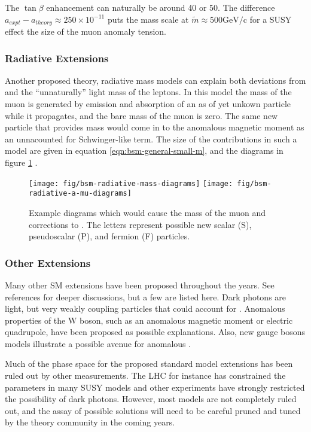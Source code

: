 The $\tan{\beta}$ enhancement can naturally be around 40 or 50.  The difference $a_{expt} - a_{theory} \approx 250 \times 10^{-11}$ puts the mass scale at $\tilde{m} \approx 500 \mathrm{GeV/c}$ for a SUSY effect the size of the muon anomaly tension.

\subsubsection{Radiative Extensions}
Another proposed theory, radiative mass models can explain both deviations from \gmtwo and the ``unnaturally'' light mass of the leptons.  In this model the mass of the muon is generated by emission and absorption of an as of yet unkown particle while it propagates, and the bare mass of the muon is zero.  The same new particle that provides mass would come in to the anomalous magnetic moment as an unnacounted for Schwinger-like term.  The size of the contributions in such a model are given in equation \ref{eqn:bsm-general-small-m}, and the diagrams in figure \ref{fig:bsm-radiative-diagrams} \cite{a-mu-harbinger}.

\begin{figure}
\label{fig:bsm-radiative-diagrams}
\centering
\texttt{[image: fig/bsm-radiative-mass-diagrams]}
\texttt{[image: fig/bsm-radiative-a-mu-diagrams]}
\caption{Example diagrams which would cause the mass of the muon and corrections to \mugmtwo.  The letters represent possible new scalar (S), pseudoscalar (P), and fermion (F) particles.}
\end{figure}

\subsubsection{Other Extensions}

Many other SM extensions have been proposed throughout the years.  See references \cite{a-mu-harbinger, the-muon-g-2, e989-tdr} for deeper discussions, but a few are listed here.  Dark photons are light, but very weakly coupling particles that could account for \mugmtwo.  Anomalous properties of the W boson, such as an anomalous magnetic moment or electric quadrupole, have been proposed as possible explanations.  Also, new gauge bosons models illustrate a possible avenue for anomalous \gmtwo.

Much of the phase space for the proposed standard model extensions has been ruled out by other measurements.  The LHC for instance has constrained the parameters in many SUSY models and other experiments have strongly restricted the possibility of dark photons.  However, most models are not completely ruled out, and the assay of possible solutions will need to be careful pruned and tuned by the theory community in the coming years.


